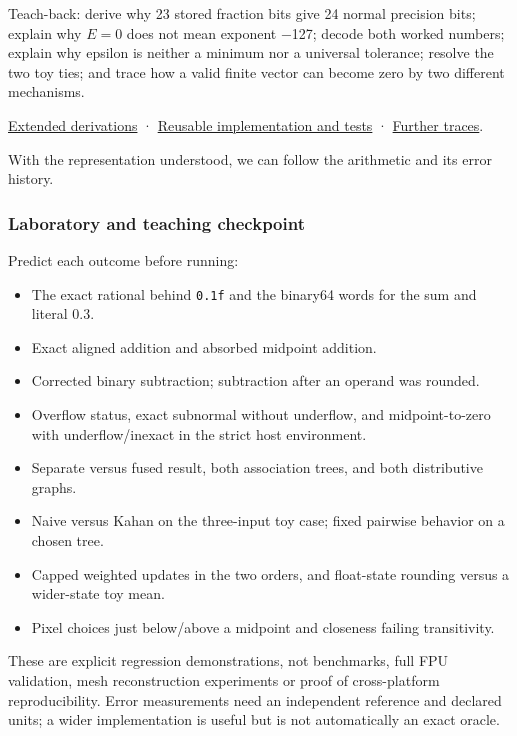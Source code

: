 Teach-back: derive why 23 stored fraction bits give 24 normal precision bits; explain why \(E=0\) does not mean exponent −127; decode both worked numbers; explain why epsilon is neither a minimum nor a universal tolerance; resolve the two toy ties; and trace how a valid finite vector can become zero by two different mechanisms.

\hyperref[01-foundations-i-ch011-m004---floating-point-fields-spacing-and-rounding]{Extended derivations} · \hyperref[appendix-4e2236f53445-m004---binary-interchange-inspection-and-strict-rounding-laboratory]{Reusable implementation and tests} · \hyperref[appendix-92ff77d4dfdc-m004---from-fields-to-values-and-failure-paths]{Further traces}.

With the representation understood, we can follow the arithmetic and its error history.

\subsubsection{Laboratory and teaching checkpoint}\label{05-engine-i-ch001-laboratory-and-teaching-checkpoint}

Predict each outcome before running:

\begin{itemize}
\tightlist
\item
  The exact rational behind \texttt{0.1f} and the binary64 words for the sum and literal 0.3.
\item
  Exact aligned addition and absorbed midpoint addition.
\item
  Corrected binary subtraction; subtraction after an operand was rounded.
\item
  Overflow status, exact subnormal without underflow, and midpoint-to-zero with underflow/inexact in the strict host environment.
\item
  Separate versus fused result, both association trees, and both distributive graphs.
\item
  Naive versus Kahan on the three-input toy case; fixed pairwise behavior on a chosen tree.
\item
  Capped weighted updates in the two orders, and float-state rounding versus a wider-state toy mean.
\item
  Pixel choices just below/above a midpoint and closeness failing transitivity.
\end{itemize}

These are explicit regression demonstrations, not benchmarks, full FPU validation, mesh reconstruction experiments or proof of cross-platform reproducibility. Error measurements need an independent reference and declared units; a wider implementation is useful but is not automatically an exact oracle.

